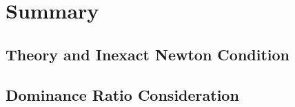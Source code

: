 \section{Summary}
\label{sec:summary}

  \subsection{Theory and Inexact Newton Condition}
  \subsection{Dominance Ratio Consideration}

